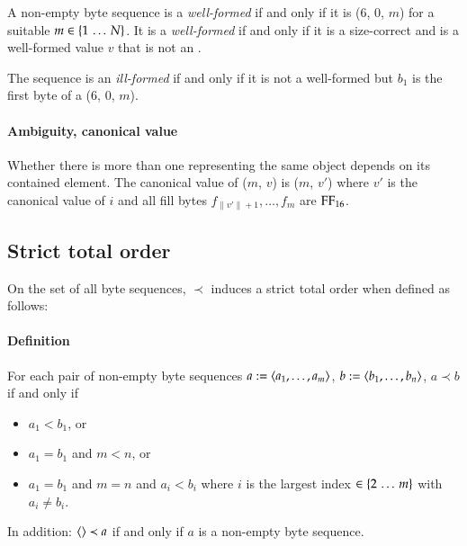 A non-empty byte sequence  is a \emph{well-formed}
\DborAllocatedValue{} if and only if it is
\DborNaturalToken*($6$, $0$, $m$) {\Concat}  for a suitable
$m \in \{1 \,\ldots\, N\}$.
It is a \emph{well-formed} \DborAllocatedValue{} if and only if it is a size-correct \DborAllocatedValue{} and
 is a well-formed value $v$ that is not an \DborAllocatedValue.

The sequence is an \emph{ill-formed} \DborAllocatedValue{} if and only if it is not a well-formed
\DborSequenceValue{} but $b_1$ is the first byte of a \DborNaturalToken*($6$, $0$, $m$).

\paragraph{Ambiguity, canonical value}

Whether there is more than one \DborAllocatedValue{} representing the same object depends on its
contained element.
The canonical value of \DborAllocatedValue($m$, $v$) is
\DborSequenceValue($m$, $v'$) where $v'$ is the canonical value of $i$
and all fill bytes $f_{\|v'\| + 1}, \ldots, f_m$ are $\mathrm{FF}_{16}$.


\subsection{Strict total order}
\label{sec:stricttotalorder}

On the set of all byte sequences, ${\prec}$ induces a strict total order when defined as follows:

\paragraph{Definition}

For each pair of non-empty byte sequences
$a := \langle a_1, \ldots, a_m \rangle$,
$b := \langle b_1, \ldots, b_n \rangle$,
$a \prec b$ if and only if
\begin{itemize}
    \item $a_1 < b_1$, or
    \item $a_1 = b_1$ and $m < n$, or
    \item $a_1 = b_1$ and $m = n$ and $a_i < b_i$ where $i$ is the largest index
    $\in \{2 \,\ldots\, m\}$ with $a_i \ne b_i$.
\end{itemize}
In addition: $\langle  \rangle \prec a$ if and only if $a$ is a non-empty byte sequence.

